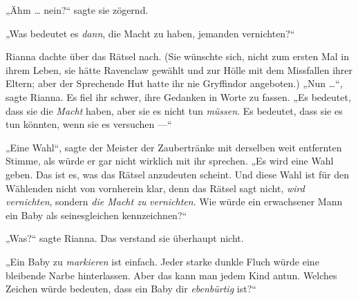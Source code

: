 „Ähm … nein?“ sagte sie zögernd.

„Was bedeutet es \emph{dann}, die Macht zu haben, jemanden vernichten?“

Rianna dachte über das Rätsel nach. (Sie wünschte sich, nicht zum ersten Mal in ihrem Leben, sie hätte Ravenclaw gewählt und zur Hölle mit dem Missfallen ihrer Eltern; aber der Sprechende Hut hatte ihr nie Gryffindor angeboten.)
„Nun …“, sagte Rianna. Es fiel ihr schwer, ihre Gedanken in Worte zu fassen.
„Es bedeutet, dass sie die \emph{Macht} haben, aber sie es nicht tun \emph{müssen}. Es bedeutet, dass sie es tun könnten, wenn sie es versuchen —“

„Eine Wahl“, sagte der Meister der Zaubertränke mit derselben weit entfernten Stimme, als würde er gar nicht wirklich mit ihr sprechen.
„Es wird eine Wahl geben. Das ist es, was das Rätsel anzudeuten scheint. Und diese Wahl ist für den Wählenden nicht von vornherein klar, denn das Rätsel sagt nicht, \emph{wird} \emph{vernichten}, sondern \emph{die Macht zu} \emph{vernichten}. Wie würde ein erwachsener Mann ein Baby als seinesgleichen kennzeichnen?“

„Was?“ sagte Rianna. Das verstand sie überhaupt nicht.

„Ein Baby zu \emph{markieren} ist einfach. Jeder starke dunkle Fluch würde eine bleibende Narbe hinterlassen. Aber das kann man jedem Kind antun. Welches Zeichen würde bedeuten, dass ein Baby dir \emph{ebenbürtig} ist?“

